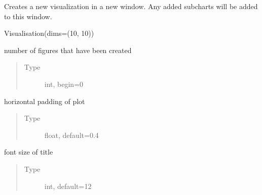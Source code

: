 \documentclass[letterpaper,10pt,english,openany,oneside]{sphinxmanual}
\begin{document}
\begin{fulllineitems}
\label{\detokenize{pygpc:pygpc.vis.Visualization}}
Creates a new visualization in a new window. Any added subcharts will be added to this window.

Visualisation(dims=(10, 10))

\begin{fulllineitems}
\label{\detokenize{pygpc:pygpc.vis.Visualization.Visualisation.figure_number}}
number of figures that have been created
\begin{quote}\begin{description}
\item[{Type}] \leavevmode
int, begin=0

\end{description}\end{quote}

\end{fulllineitems}


\begin{fulllineitems}
\label{\detokenize{pygpc:pygpc.vis.Visualization.Visualisation.horizontal_padding}}
horizontal padding of plot
\begin{quote}\begin{description}
\item[{Type}] \leavevmode
float, default=0.4

\end{description}\end{quote}

\end{fulllineitems}


\begin{fulllineitems}
\label{\detokenize{pygpc:pygpc.vis.Visualization.Visualisation.font_size_label}}
font size of title
\begin{quote}\begin{description}
\item[{Type}] \leavevmode
int, default=12


\end{description}
\end{quote}
\end{fulllineitems}
\end{fulllineitems}
\end{document}
